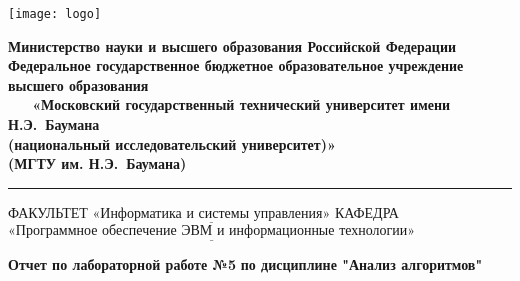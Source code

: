   \thispagestyle{empty}
  \begin{titlepage}
      \noindent \begin{minipage}{0.15\textwidth}
      \texttt{[image: logo]}
      \end{minipage}
      \noindent\begin{minipage}{0.9\textwidth}\centering
          \textbf{Министерство науки и высшего образования Российской Федерации}\\
          \textbf{Федеральное государственное бюджетное образовательное учреждение высшего образования}\\
          \textbf{~~~«Московский государственный технический университет имени Н.Э.~Баумана}\\
          \textbf{(национальный исследовательский университет)»}\\
          \textbf{(МГТУ им. Н.Э.~Баумана)}
      \end{minipage}
      
      \noindent\rule{18cm}{3pt}
      \newline\newline
      \noindent ФАКУЛЬТЕТ $\underline{\text{«Информатика и системы управления»}}$ \newline\newline
      \noindent КАФЕДРА $\underline{\text{«Программное обеспечение ЭВМ и информационные технологии»}}$\newline\newline\newline\newline\newline\newline\newline\newline\newline\newline\newline
      
      
      \begin{center}
          \noindent\begin{minipage}{1.3\textwidth}\centering
              \Large\textbf{  Отчет по лабораторной работе №5}\newline
              \textbf{по дисциплине "Анализ алгоритмов"}\newline\newline
          \end{minipage}
      \end{center}
      

\end{titlepage}
